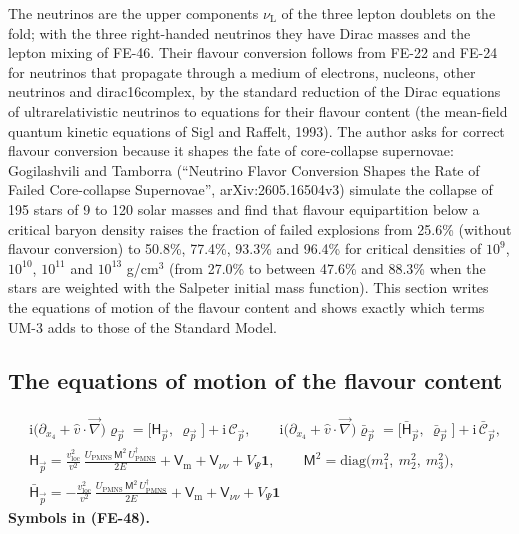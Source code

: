 \documentclass[
  10pt,
]{article}
\begin{document}
The neutrinos are the upper components \(\nu_{\mathrm{L}}\) of the three
lepton doublets on the fold; with the three right-handed neutrinos they
have Dirac masses and the lepton mixing of FE-46. Their flavour
conversion follows from FE-22 and FE-24 for neutrinos that propagate
through a medium of electrons, nucleons, other neutrinos and
dirac16complex, by the standard reduction of the Dirac equations of
ultrarelativistic neutrinos to equations for their flavour content (the
mean-field quantum kinetic equations of Sigl and Raffelt, 1993). The
author asks for correct flavour conversion because it shapes the fate of
core-collapse supernovae: Gogilashvili and Tamborra (``Neutrino Flavor
Conversion Shapes the Rate of Failed Core-collapse Supernovae'',
arXiv:2605.16504v3) simulate the collapse of 195 stars of 9 to 120 solar
masses and find that flavour equipartition below a critical baryon
density raises the fraction of failed explosions from 25.6\% (without
flavour conversion) to 50.8\%, 77.4\%, 93.3\% and 96.4\% for critical
densities of \(10^9\), \(10^{10}\), \(10^{11}\) and \(10^{13}\)
g/cm\(^3\) (from 27.0\% to between 47.6\% and 88.3\% when the stars are
weighted with the Salpeter initial mass function). This section writes
the equations of motion of the flavour content and shows exactly which
terms UM-3 adds to those of the Standard Model.

\hypertarget{the-equations-of-motion-of-the-flavour-content}{%
\subsection{The equations of motion of the flavour
content}\label{the-equations-of-motion-of-the-flavour-content}}

\[
\begin{aligned}
&\mathrm{i}\big(\partial_{x_4} + \hat v\cdot\vec\nabla\big)\varrho_{\vec p} = \big[\mathsf{H}_{\vec p},\ \varrho_{\vec p}\big] + \mathrm{i}\,\mathcal{C}_{\vec p},\qquad
 \mathrm{i}\big(\partial_{x_4} + \hat v\cdot\vec\nabla\big)\bar\varrho_{\vec p} = \big[\bar{\mathsf{H}}_{\vec p},\ \bar\varrho_{\vec p}\big] + \mathrm{i}\,\bar{\mathcal{C}}_{\vec p},\\
&\mathsf{H}_{\vec p} = \frac{v_{\mathrm{loc}}^2}{v^2}\,\frac{U_{\mathrm{PMNS}}\,\mathsf{M}^2\,U_{\mathrm{PMNS}}^\dagger}{2E} + \mathsf{V}_{\mathrm{m}} + \mathsf{V}_{\nu\nu} + V_\Psi\mathbf{1},\qquad
 \mathsf{M}^2 = \mathrm{diag}\big(m_1^2,\ m_2^2,\ m_3^2\big),\\
&\bar{\mathsf{H}}_{\vec p} = -\frac{v_{\mathrm{loc}}^2}{v^2}\,\frac{U_{\mathrm{PMNS}}\,\mathsf{M}^2\,U_{\mathrm{PMNS}}^\dagger}{2E} + \mathsf{V}_{\mathrm{m}} + \mathsf{V}_{\nu\nu} + V_\Psi\mathbf{1}
\end{aligned} \tag{FE-48}
\] \textbf{Symbols in (FE-48).}
\end{document}
